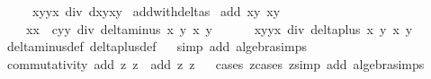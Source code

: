 \begin{isabellebody}
\ \ \ \ \ {\isacharparenleft}x{}{\isacharasterisk}y{}{\isacharplus}y{}{\isacharasterisk}x{}{\isacharparenright}\ div\ {\isacharparenleft}{}{\isacharplus}d{\isacharasterisk}x{}{\isacharasterisk}y{}{\isacharasterisk}x{}{\isacharasterisk}y{}{\isacharparenright}{\isacharparenright}{\isachardoublequoteclose}\isanewline
\isanewline
{}\isamarkupfalse%
\ add{\isacharunderscore}with{\isacharunderscore}deltas{\isacharcolon}\isanewline
\ {\isachardoublequoteopen}add\ {\isacharparenleft}x{}{\isacharcomma}y{}{\isacharparenright}\ {\isacharparenleft}x{}{\isacharcomma}y{}{\isacharparenright}\ {\isacharequal}\isanewline
\ \ \ \ {\isacharparenleft}{\isacharparenleft}x{}{\isacharasterisk}x{}\ {\isacharminus}\ c{\isacharasterisk}y{}{\isacharasterisk}y{}{\isacharparenright}\ div\ {\isacharparenleft}delta{\isacharunderscore}minus\ x{}\ y{}\ x{}\ y{}{\isacharparenright}{\isacharcomma}\ \isanewline
\ \ \ \ \ {\isacharparenleft}x{}{\isacharasterisk}y{}{\isacharplus}y{}{\isacharasterisk}x{}{\isacharparenright}\ div\ {\isacharparenleft}delta{\isacharunderscore}plus\ x{}\ y{}\ x{}\ y{}{\isacharparenright}{\isacharparenright}{\isachardoublequoteclose}\isanewline
%
\isadelimproof
\ \ %
\endisadelimproof
%
\isatagproof
{}\isamarkupfalse%
\ delta{\isacharunderscore}minus{\isacharunderscore}def\ delta{\isacharunderscore}plus{\isacharunderscore}def\isanewline
\ \ \isamarkupfalse%
{\isacharparenleft}simp\ add{\isacharcolon}\ algebra{\isacharunderscore}simps{\isacharparenright}%
\endisatagproof
{\isafoldproof}%
%
\isadelimproof
\isanewline
%
\endisadelimproof
\isanewline
{}\isamarkupfalse%
\ commutativity{\isacharcolon}\ {\isachardoublequoteopen}add\ z{}\ z{}\ {\isacharequal}\ add\ z{}\ z{}{\isachardoublequoteclose}\isanewline
%
\isadelimproof
\ \ %
\endisadelimproof
%
\isatagproof
{}\isamarkupfalse%
{\isacharparenleft}cases\ {\isachardoublequoteopen}z{}{\isachardoublequoteclose}{\isacharcomma}cases\ {\isachardoublequoteopen}z{}{\isachardoublequoteclose}{\isacharcomma}simp\ add{\isacharcolon}\ algebra{\isacharunderscore}simps{\isacharparenright}%
\endisatagproof
{\isafoldproof}%
%
\isadelimproof
\isanewline

\end{isabellebody}
